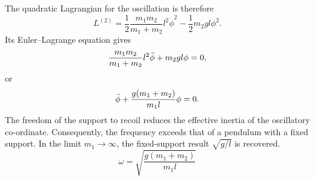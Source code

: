 \begin{problem}[title={Small oscillations, sliding-support pendulum}]
{The quadratic Lagrangian for the oscillation is therefore
\begin{equation*}
    L^{(2)} = \frac{1}{2}\frac{m_1m_2}{m_1 + m_2}l^2\Dot{\phi}^2 - \frac{1}{2}m_2gl\phi^2.
\end{equation*}
Its Euler--Lagrange equation gives
\begin{equation*}
    \frac{m_1m_2}{m_1 + m_2}l^2\Ddot{\phi} + m_2gl\phi = 0,
\end{equation*}
or
\begin{equation*}
    \Ddot{\phi} + \frac{g(m_1 + m_2)}{m_1l}\phi = 0.
\end{equation*}
The freedom of the support to recoil reduces the effective inertia of the oscillatory co-ordinate. Consequently, the frequency exceeds that of a pendulum with a fixed support. In the limit $m_1 \to \infty$, the fixed-support result $\sqrt{g/l}$ is recovered.
}
{
\begin{equation*}
    \omega = \sqrt{\frac{g(m_1 + m_2)}{m_1l}}
\end{equation*}
}
\end{problem}


